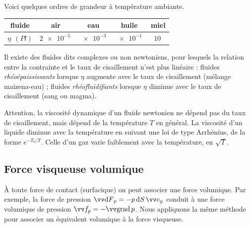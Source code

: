 \documentclass[12pt,fancy]{cours}
\begin{document}
Voici quelques ordres de grandeur à température ambiante.

\begin{center}
\begin{tabular}{|c||c|c|c|c|}
\hline
fluide & air & eau & huile & miel \\
\hline
$\eta~\SI{}{(Pl)}$ &  $\SI{2e-5}{}$ &
$\SI{e-3}{}$ & $\SI{e-1}{}$  & $\SI{10}{}$ \\
\hline
\end{tabular}
\end{center}



\begin{remarque}
Il existe des fluides dits complexes ou non newtoniens, pour lesquels la relation entre la contrainte et le taux de cisaillement n'est plus linéaire : fluides \emph{rhéoépaississants} lorsque $\eta$ augmente avec le taux de cisaillement (mélange maizena-eau) ;  fluides \emph{rhéofluidifiants} lorsque $\eta$ diminue avec le taux de cisaillement (sang ou magma).
\end{remarque}
\begin{remarque}
	Attention, la viscosité dynamique d’un fluide newtonien ne dépend pas du taux de cisaillement, mais dépend de la température $T$ en général.
La viscosité d'un liquide diminue avec la température en suivant une loi de type Arrhénius, de la forme $e^{-T_0/T}$. Celle d'un gaz varie faiblement avec la température, en $\sqrt{T}$.
\end{remarque}


\subsection{Force visqueuse volumique}

À toute force de contact (surfacique) on peut associer une force volumique.
Par exemple, la force de pression $\Vec{\d F}_p = - p\, \d S \,\ey$ conduit à une force volumique de pression  $\Vec{f_p} = - \grad{p}$. Nous appliquons la même méthode pour
 associer un équivalent volumique à la force visqueuse.
\end{document}
